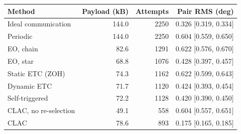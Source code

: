 \begin{tabular}{@{}lrrr@{}}
\toprule
Method & Payload (kB) & Attempts & Pair RMS (deg)\\
\midrule
Ideal communication & 144.0 & 2250 & 0.326 [0.319, 0.334]\\
Periodic & 144.0 & 2250 & 0.604 [0.559, 0.650]\\
EO, chain & 82.6 & 1291 & 0.622 [0.576, 0.670]\\
EO, star & 68.8 & 1076 & 0.428 [0.397, 0.457]\\
Static ETC (ZOH) & 74.3 & 1162 & 0.622 [0.599, 0.643]\\
Dynamic ETC & 71.7 & 1120 & 0.424 [0.393, 0.454]\\
Self-triggered & 72.2 & 1128 & 0.420 [0.390, 0.450]\\
CLAC, no re-selection & 49.1 & 558 & 0.604 [0.557, 0.651]\\
CLAC & 78.6 & 893 & 0.175 [0.165, 0.185]\\
\bottomrule
\end{tabular}
